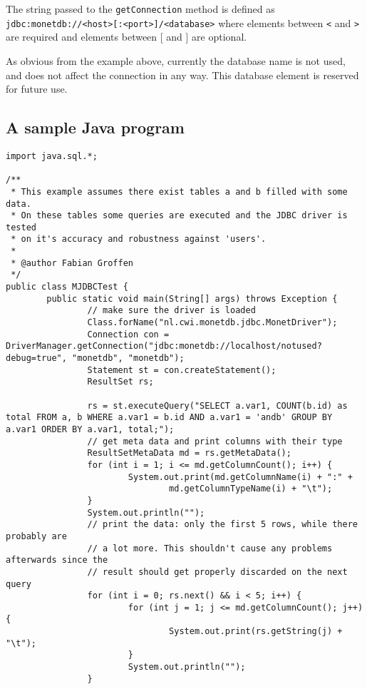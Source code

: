 \documentclass{article}
\begin{document}
The string passed to the \verb"getConnection" method is defined as
\verb"jdbc:monetdb://<host>[:<port>]/<database>" where elements between
\verb"<" and \verb">" are required and elements between [ and ] are optional.

As obvious from the example above, currently the database name is not used, and does not affect
the connection in any way. This database element is reserved for future use.

\subsection{A sample Java program}
\begin{verbatim}
import java.sql.*;

/**
 * This example assumes there exist tables a and b filled with some data.
 * On these tables some queries are executed and the JDBC driver is tested
 * on it's accuracy and robustness against 'users'.
 *
 * @author Fabian Groffen
 */
public class MJDBCTest {
        public static void main(String[] args) throws Exception {
                // make sure the driver is loaded
                Class.forName("nl.cwi.monetdb.jdbc.MonetDriver");
                Connection con = DriverManager.getConnection("jdbc:monetdb://localhost/notused?debug=true", "monetdb", "monetdb");
                Statement st = con.createStatement();
                ResultSet rs;

                rs = st.executeQuery("SELECT a.var1, COUNT(b.id) as total FROM a, b WHERE a.var1 = b.id AND a.var1 = 'andb' GROUP BY a.var1 ORDER BY a.var1, total;");
                // get meta data and print columns with their type
                ResultSetMetaData md = rs.getMetaData();
                for (int i = 1; i <= md.getColumnCount(); i++) {
                        System.out.print(md.getColumnName(i) + ":" +
                                md.getColumnTypeName(i) + "\t");
                }
                System.out.println("");
                // print the data: only the first 5 rows, while there probably are
                // a lot more. This shouldn't cause any problems afterwards since the
                // result should get properly discarded on the next query
                for (int i = 0; rs.next() && i < 5; i++) {
                        for (int j = 1; j <= md.getColumnCount(); j++) {
                                System.out.print(rs.getString(j) + "\t");
                        }
                        System.out.println("");
                }


\end{verbatim}
\end{document}
